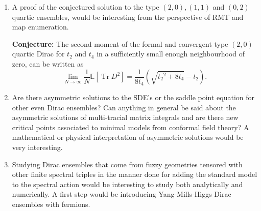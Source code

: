 \documentclass[11pt]{article}
\theoremstyle{plain}
\DeclareMathOperator{\tr}{Tr}
\begin{document}
\begin{enumerate}
We are also curious about studying the critical points of higher signature Dirac ensembles. Based on their critical exponents,  we expect the one conjectured solution to the type $(2,0), (1,1)$ and $(0,2)$ quartic ensembles to be connected to the Random Continuum Tree.
\item 
A proof of the conjectured solution to the  type $(2,0), (1,1)$ and $(0,2)$ quartic ensembles, would be interesting from the perspective of RMT and map enumeration.

{\bf Conjecture:}
The second moment of the formal and convergent type $(2,0)$ quartic Dirac for $t_{2}$ and $t_{4}$ in a sufficiently small enough neighbourhood of zero, can be written as 
$$\lim_{N \rightarrow \infty} \frac{1}{N} \mathbb{E}[\tr D^2]= 
\frac{1}{8 t_{4}} \left({\sqrt{{t_2}^2+8
		{t_4}}}-{{t_2}}\right).$$

\item Are there asymmetric solutions to the SDE's or the saddle point equation for other even Dirac ensembles? Can anything in general be said about the asymmetric solutions of multi-tracial matrix integrals and are there new critical points associated to minimal models from conformal field theory? A mathematical or physical interpretation of asymmetric solutions would be very interesting. 

\item Studying Dirac ensembles that come from fuzzy geometries tensored with other finite spectral triples in the manner done for adding the standard model to the spectral action would be interesting to study both analytically and numerically. A first step would be introducing Yang-Mills-Higgs Dirac ensembles with fermions. 


\end{enumerate}
\end{document}
